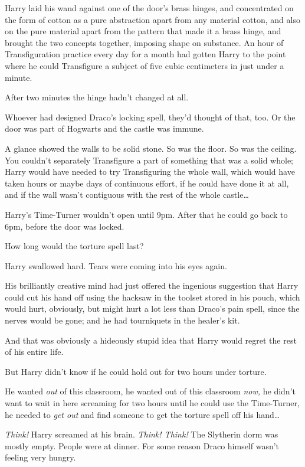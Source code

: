 Harry laid his wand against one of the door's brass hinges, and concentrated on
the form of cotton as a pure abstraction apart from any material cotton, and
also on the pure material apart from the pattern that made it a brass hinge,
and brought the two concepts together, imposing shape on substance. An hour of
Transfiguration practice every day for a month had gotten Harry to the point
where he could Transfigure a subject of five cubic centimeters in just under a
minute.

After two minutes the hinge hadn't changed at all.

Whoever had designed Draco's locking spell, they'd thought of that, too. Or the
door was part of Hogwarts and the castle was immune.

A glance showed the walls to be solid stone. So was the floor. So was the
ceiling. You couldn't separately Transfigure a part of something that was a
solid whole; Harry would have needed to try Transfiguring the whole wall, which
would have taken hours or maybe days of continuous effort, if he could have
done it at all, and if the wall wasn't contiguous with the rest of the whole
castle{\ldots}

Harry's Time-Turner wouldn't open until 9pm. After that he could go back to
6pm, before the door was locked.

How long would the torture spell last?

Harry swallowed hard. Tears were coming into his eyes again.

His brilliantly creative mind had just offered the ingenious suggestion that
Harry could cut his hand off using the hacksaw in the toolset stored in his
pouch, which would hurt, obviously, but might hurt a lot less than Draco's pain
spell, since the nerves would be gone; and he had tourniquets in the healer's
kit.

And that was obviously a hideously stupid idea that Harry would regret the rest
of his entire life.

But Harry didn't know if he could hold out for two hours under torture.

He wanted \emph{out} of this classroom, he wanted out of this classroom
\emph{now,} he didn't want to wait in here screaming for two hours until he
could use the Time-Turner, he needed to \emph{get out} and find someone to get
the torture spell off his hand{\ldots}

\emph{Think!} Harry screamed at his brain. \emph{Think! Think!}
\sbreak
The Slytherin dorm was mostly empty. People were at dinner. For some reason
Draco himself wasn't feeling very hungry.

